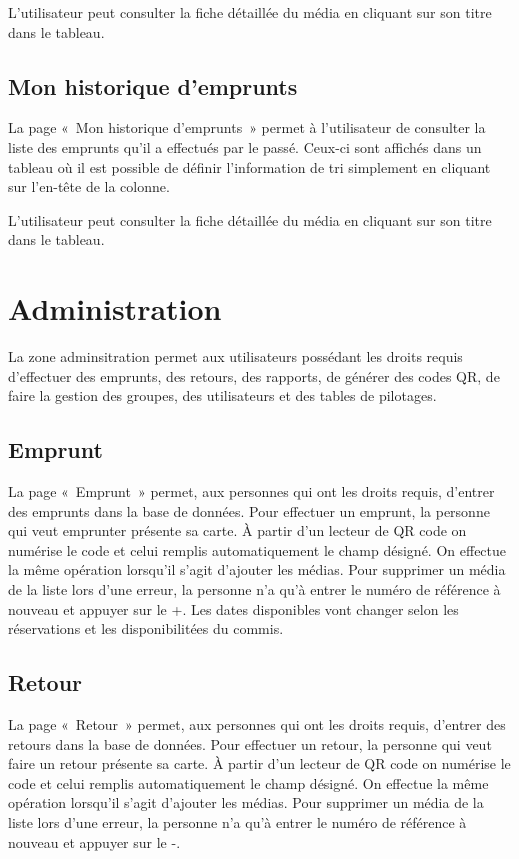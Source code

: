 \documentclass[letter, 11pt]{report}
\begin{document}
L'utilisateur peut consulter la fiche détaillée du média en cliquant sur son titre dans le tableau.

\subsection{Mon historique d'emprunts}

La page «~Mon historique d'emprunts~» permet à l'utilisateur de consulter la liste des emprunts qu'il a effectués par le passé. Ceux-ci sont affichés dans un tableau où il est possible de définir l'information de tri simplement en cliquant sur l'en-tête de la colonne.

L'utilisateur peut consulter la fiche détaillée du média en cliquant sur son titre dans le tableau.

\section{Administration}
La zone adminsitration permet aux utilisateurs possédant les droits requis d'effectuer des emprunts, des retours, des rapports, de générer des codes QR, de faire la gestion des groupes, des utilisateurs et des tables de pilotages.

\subsection{Emprunt}
La page «~Emprunt~» permet, aux personnes qui ont les droits requis, d'entrer des emprunts dans la base de données. Pour effectuer un emprunt, la personne qui veut emprunter présente sa carte. À partir d'un lecteur de QR code on numérise le code et celui remplis automatiquement le champ désigné. On effectue la même opération lorsqu'il s'agit d'ajouter les médias. Pour supprimer un média de la liste lors d'une erreur, la personne n'a qu'à entrer le numéro de référence à nouveau et appuyer sur le +. Les dates disponibles vont changer selon les réservations et les disponibilitées du commis.

\subsection{Retour}
La page «~Retour~» permet, aux personnes qui ont les droits requis, d'entrer des retours dans la base de données. Pour effectuer un retour, la personne qui veut faire un retour présente sa carte. À partir d'un lecteur de QR code on numérise le code et celui remplis automatiquement le champ désigné. On effectue la même opération lorsqu'il s'agit d'ajouter les médias. Pour supprimer un média de la liste lors d'une erreur, la personne n'a qu'à entrer le numéro de référence à nouveau et appuyer sur le -.
\end{document}
